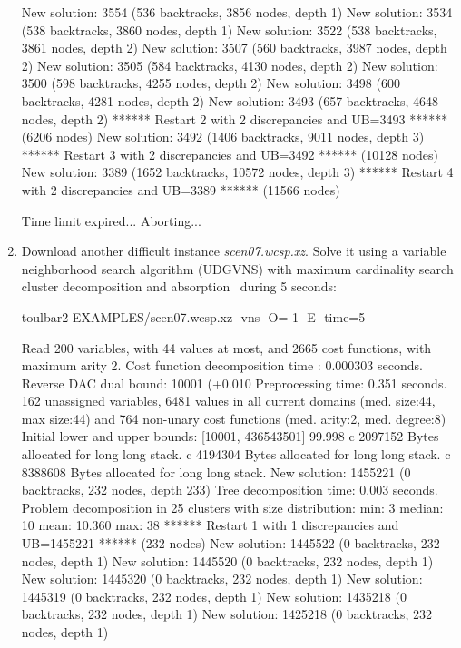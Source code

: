 \begin{enumerate}
{\begin{DoxyCode}
New solution: 3554 (536 backtracks, 3856 nodes, depth 1)
New solution: 3534 (538 backtracks, 3860 nodes, depth 1)
New solution: 3522 (538 backtracks, 3861 nodes, depth 2)
New solution: 3507 (560 backtracks, 3987 nodes, depth 2)
New solution: 3505 (584 backtracks, 4130 nodes, depth 2)
New solution: 3500 (598 backtracks, 4255 nodes, depth 2)
New solution: 3498 (600 backtracks, 4281 nodes, depth 2)
New solution: 3493 (657 backtracks, 4648 nodes, depth 2)
****** Restart 2 with 2 discrepancies and UB=3493 ****** (6206 nodes)
New solution: 3492 (1406 backtracks, 9011 nodes, depth 3)
****** Restart 3 with 2 discrepancies and UB=3492 ****** (10128 nodes)
New solution: 3389 (1652 backtracks, 10572 nodes, depth 3)
****** Restart 4 with 2 discrepancies and UB=3389 ****** (11566 nodes)

Time limit expired... Aborting...
\end{DoxyCode}}
\item Download another difficult instance {\em scen07.wcsp.xz}. Solve it using a variable neighborhood search algorithm (UDGVNS) with maximum cardinality search cluster decomposition and absorption~\cite{Ouali17} during 5 seconds:
\begin{DoxyCode}
	toulbar2 EXAMPLES/scen07.wcsp.xz -vns -O=-1 -E -time=5
\end{DoxyCode}
{\scriptsize
\begin{DoxyCode}
Read 200 variables, with 44 values at most, and 2665 cost functions, with maximum arity 2.
Cost function decomposition time : 0.000303 seconds.
Reverse DAC dual bound: 10001 (+0.010%
Preprocessing time: 0.351 seconds.
162 unassigned variables, 6481 values in all current domains (med. size:44, max size:44) and 764 non-unary cost functions (med. arity:2, med. degree:8)
Initial lower and upper bounds: [10001, 436543501] 99.998%
c 2097152 Bytes allocated for long long stack.
c 4194304 Bytes allocated for long long stack.
c 8388608 Bytes allocated for long long stack.
New solution: 1455221 (0 backtracks, 232 nodes, depth 233)
Tree decomposition time: 0.003 seconds.
Problem decomposition in 25 clusters with size distribution: min: 3 median: 10 mean: 10.360 max: 38
****** Restart 1 with 1 discrepancies and UB=1455221 ****** (232 nodes)
New solution: 1445522 (0 backtracks, 232 nodes, depth 1)
New solution: 1445520 (0 backtracks, 232 nodes, depth 1)
New solution: 1445320 (0 backtracks, 232 nodes, depth 1)
New solution: 1445319 (0 backtracks, 232 nodes, depth 1)
New solution: 1435218 (0 backtracks, 232 nodes, depth 1)
New solution: 1425218 (0 backtracks, 232 nodes, depth 1)

\end{DoxyCode}}
\end{enumerate}
